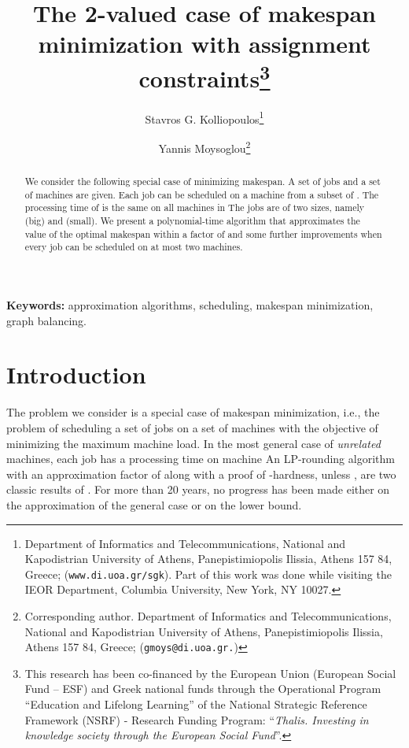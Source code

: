 \documentclass[11pt]{article}\usepackage{amsmath}
\date{}
\begin{document}
\title{The 2-valued case of makespan minimization with assignment constraints\thanks{This research has been co-financed by the European Union (European Social Fund -- ESF) and
Greek national funds through the Operational Program ``Education and Lifelong Learning'' of the
National Strategic Reference Framework (NSRF) - Research Funding Program:
``{\sl Thalis. Investing in knowledge society through the European Social Fund}''.}}
\author {Stavros G. Kolliopoulos\thanks{Department of Informatics and
Telecommunications, National and Kapodistrian 
University of Athens, Panepistimiopolis Ilissia, Athens
157 84, Greece; (\texttt{www.di.uoa.gr/}\~{\tt sgk}). Part of this
work was done while visiting the 
  IEOR Department, Columbia University, New York, NY 10027.}   
\and Yannis Moysoglou\thanks{ Corresponding author. Department of Informatics and
Telecommunications, National and Kapodistrian 
University of Athens, Panepistimiopolis Ilissia, Athens
157 84, Greece; (\texttt{gmoys@di.uoa.gr.}) } }
\maketitle



\begin{abstract}
We consider  the following   special case of minimizing makespan.  
A set of jobs  
and a set of machines  are given. Each job  can be
scheduled on a  machine
from a subset  of . The processing time of  is the same on
all  machines in  The jobs  are of two sizes, namely  (big) and
 (small). We present  a polynomial-time  algorithm that
approximates the value of the optimal makespan  within a 
factor of  and some further improvements  when every job
can be scheduled on at most two machines. 
\end{abstract} 

{\bf Keywords:} approximation algorithms, scheduling, 
makespan minimization, graph balancing. 


\section{Introduction}


 The problem we  consider is a special case  of makespan minimization,
 i.e., the problem  of scheduling a set of jobs  on a set of
 machines  
 with the objective
 of  minimizing the  maximum machine load.  In the  most
 general case  of \emph{unrelated} machines,  each job  has a
 processing  time    on  machine    An  LP-rounding
 algorithm with an  approximation factor of  along  with a proof of
 -hardness, unless , are two
 classic results of \cite{lenstra}. For more than 20 years, 
no progress has
 been made either  on the approximation of the general  case or on the
 lower bound.
\end{document}

